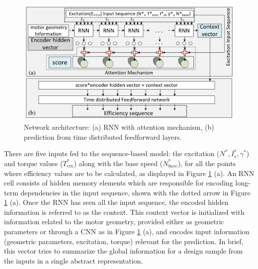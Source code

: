 \begin{figure}[h!]
    \centering
    \includegraphics[width=\textwidth]{Figures/Chp_RNN/Fig 4.png}
    \caption{Network architecture: (a) RNN with attention mechanism, (b) prediction from time distributed feedforward layers.}
    \label{fig:RNN_Fig-4_RNN_EffMaps}
\end{figure}

There are five inputs fed to the sequence-based model: the excitation ($N^*,I_s^*,\gamma^*$) and torque values ($T_{em}^*$) along with the base speed ($N_{base}^*$), for all the points where efficiency values are to be calculated, as displayed in Figure \ref{fig:RNN_Fig-4_RNN_EffMaps} (a). An RNN cell consists of hidden memory elements which are responsible for encoding long-term dependencies \parencite{graves2013speech} in the input sequence, shown with the dotted arrow in Figure \ref{fig:RNN_Fig-4_RNN_EffMaps} (a). Once the RNN has seen all the input sequence, the encoded hidden information is referred to as the context. This context vector is initialized with information related to the motor geometry, provided either as geometric parameters or through a CNN as in Figure \ref{fig:RNN_Fig-4_RNN_EffMaps} (a), and encodes input information (geometric parameters, excitation, torque) relevant for the prediction. In brief, this vector tries to summarize the global information for a design sample from the inputs in a single abstract representation. 

